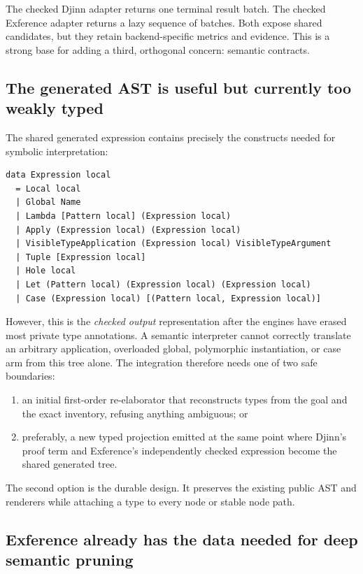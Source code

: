 \documentclass[11pt,oneside]{article}
\begin{document}
The checked Djinn adapter returns one terminal result batch. The checked Exference
adapter returns a lazy sequence of batches. Both expose shared candidates, but they
retain backend-specific metrics and evidence. This is a strong base for adding a
third, orthogonal concern: semantic contracts.

\subsection{The generated AST is useful but currently too weakly typed}

The shared generated expression contains precisely the constructs needed for symbolic
interpretation:

\begin{lstlisting}[language=HaskellExt,caption={Simplified shape of Djex's shared generated expression}]
data Expression local
  = Local local
  | Global Name
  | Lambda [Pattern local] (Expression local)
  | Apply (Expression local) (Expression local)
  | VisibleTypeApplication (Expression local) VisibleTypeArgument
  | Tuple [Expression local]
  | Hole local
  | Let (Pattern local) (Expression local) (Expression local)
  | Case (Expression local) [(Pattern local, Expression local)]
\end{lstlisting}

However, this is the \emph{checked output} representation after the engines have erased
most private type annotations. A semantic interpreter cannot correctly translate an
arbitrary application, overloaded global, polymorphic instantiation, or case arm from
this tree alone. The integration therefore needs one of two safe boundaries:

\begin{enumerate}
  \item an initial first-order re-elaborator that reconstructs types from the goal and
        the exact inventory, refusing anything ambiguous; or
  \item preferably, a new typed projection emitted at the same point where Djinn's
        proof term and Exference's independently checked expression become the shared
        generated tree.
\end{enumerate}

The second option is the durable design. It preserves the existing public AST and
renderers while attaching a type to every node or stable node path.

\subsection{Exference already has the data needed for deep semantic pruning}
\end{document}
